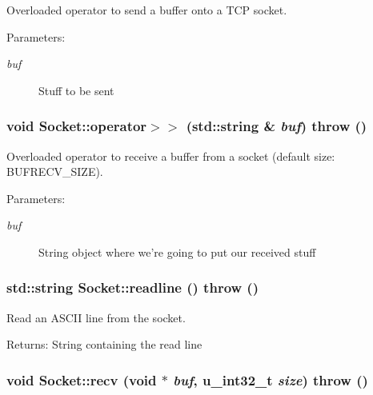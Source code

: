 Overloaded operator to send a buffer onto a TCP socket. 

\begin{Desc}
\item[Parameters:]
\begin{description}
\item[{\em buf}]Stuff to be sent \end{description}
\end{Desc}
\hypertarget{classSocket_a24765df6a964745bf202573ff79e543}{
\subsubsection[{operator$>$$>$}]{\setlength{\rightskip}{0pt plus 5cm}void Socket::operator$>$$>$ (std::string \& {\em buf})  throw ()}}
\label{classSocket_a24765df6a964745bf202573ff79e543}


Overloaded operator to receive a buffer from a socket (default size: BUFRECV\_\-SIZE). 

\begin{Desc}
\item[Parameters:]
\begin{description}
\item[{\em buf}]String object where we're going to put our received stuff \end{description}
\end{Desc}
\hypertarget{classSocket_8e6666aa80f6b3be532f382c8fe52a57}{
\subsubsection[{readline}]{\setlength{\rightskip}{0pt plus 5cm}std::string Socket::readline ()  throw ()}}
\label{classSocket_8e6666aa80f6b3be532f382c8fe52a57}


Read an ASCII line from the socket. 

\begin{Desc}
\item[Returns:]String containing the read line \end{Desc}
\hypertarget{classSocket_21a85ab2cc66b4e6f399c6b119f8263d}{
\subsubsection[{recv}]{\setlength{\rightskip}{0pt plus 5cm}void Socket::recv (void $\ast$ {\em buf}, \/  u\_\-int32\_\-t {\em size})  throw ()}}
\label{classSocket_21a85ab2cc66b4e6f399c6b119f8263d}


